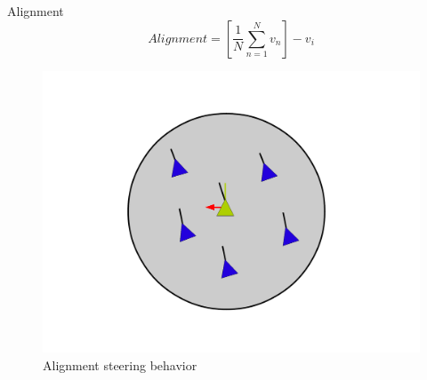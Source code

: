 \documentclass[red]{beamer}
\begin{document}
\begin{frame}{Alignment}
	\begin{equation}
	\label{alignmentEquation}
	Alignment = \left[  \frac{1}{N} \sum_{n=1}^{N} v_n \right ] - v_i
	\end{equation}
	
	\begin{figure}[htbp]
	\begin{center}
	\includegraphics[scale=0.15]{../figures/alignment.pdf}
	\caption{Alignment steering behavior}
	\label{alignment}
	\end{center}
	\end{figure}
\end{frame}
\end{document}
